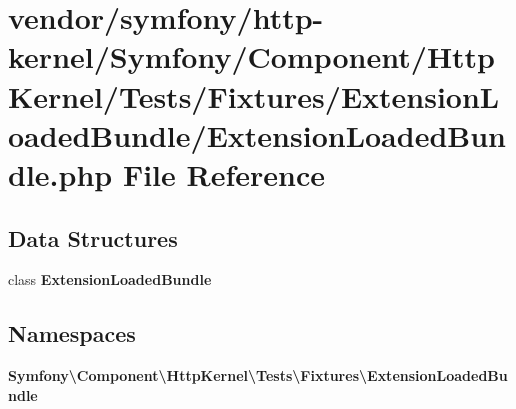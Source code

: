 \section{vendor/symfony/http-\/kernel/\+Symfony/\+Component/\+Http\+Kernel/\+Tests/\+Fixtures/\+Extension\+Loaded\+Bundle/\+Extension\+Loaded\+Bundle.php File Reference}
\label{_extension_loaded_bundle_8php}
\subsection*{Data Structures}
\begin{DoxyCompactItemize}
\item 
class {\bf Extension\+Loaded\+Bundle}
\end{DoxyCompactItemize}
\subsection*{Namespaces}
\begin{DoxyCompactItemize}
\item 
 {\bf Symfony\textbackslash{}\+Component\textbackslash{}\+Http\+Kernel\textbackslash{}\+Tests\textbackslash{}\+Fixtures\textbackslash{}\+Extension\+Loaded\+Bundle}
\end{DoxyCompactItemize}
